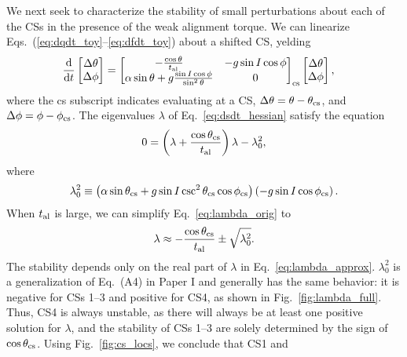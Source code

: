 \documentclass[
        fleqn,
        usenatbib,
    ]{mnras}
\newcommand*{\rd}[2]{\frac{\mathrm{d}#1}{\mathrm{d}#2}}
\newcommand*{\p}[1]{\left(#1\right)}
\begin{document}
We next seek to characterize the stability of small perturbations about each of
the CSs in the presence of the weak alignment torque. We can linearize
Eqs.~(\ref{eq:dqdt_toy}--\ref{eq:dfdt_toy}) about a shifted CS, yelding
\begin{align}
    \rd{}{t}\begin{bmatrix}
        \Delta \theta\\ \Delta \phi
    \end{bmatrix} &= \begin{bmatrix}
        -\frac{\cos \theta}{t_{\rm al}} &
        -g\sin I \cos \phi \\
        \alpha \sin \theta + g\frac{\sin I \cos \phi}{\sin^2\theta} &
        0
    \end{bmatrix}_{\rm cs}\begin{bmatrix}
        \Delta \theta \\ \Delta \phi
    \end{bmatrix},\label{eq:dsdt_hessian}
\end{align}
where the cs subscript indicates evaluating at a CS, $\Delta \theta = \theta -
\theta_{\rm cs}$, and $\Delta \phi = \phi - \phi_{\rm cs}$. The eigenvalues
$\lambda$ of Eq.~\eqref{eq:dsdt_hessian} satisfy the equation
\begin{equation}
    0 = \p{\lambda + \frac{\cos \theta_{\rm cs}}{t_{\rm al}}}\lambda
        - \lambda_0^2,\label{eq:lambda_orig}
\end{equation}
where
\begin{equation}
    \lambda_0^2 \equiv \p{\alpha
        \sin \theta_{\rm cs} + g\sin I \csc^2\theta_{\rm cs}\cos \phi_{\rm cs}}
            \p{- g \sin I \cos \phi_{\rm cs}}\label{eq:def_l0_sq}.
\end{equation}
When $t_{\rm al}$ is large, we can simplify Eq.~\eqref{eq:lambda_orig} to
\begin{equation}
    \lambda \approx -\frac{\cos \theta_{\rm cs}}{t_{\rm al}}
        \pm \sqrt{\lambda_0^2}. \label{eq:lambda_approx}
\end{equation}
The stability depends only on the real part of $\lambda$ in
Eq.~\eqref{eq:lambda_approx}. $\lambda_0^2$ is a generalization of Eq.~(A4)
in Paper I and generally has the same behavior: it is negative for CSs
1--3 and positive for CS4, as shown in Fig.~\ref{fig:lambda_full}. Thus, CS4 is
always unstable, as there will always be at least one positive solution for
$\lambda$, and the stability of CSs 1--3 are solely determined by the sign of
$\cos \theta_{\rm cs}$. Using Fig.~\ref{fig:cs_locs}, we conclude that CS1 and
\end{document}
